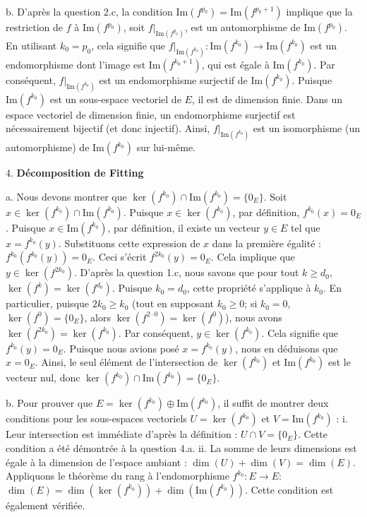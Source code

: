 \documentclass{report}
\begin{document}
    b.  D'après la question 2.c, la condition $\text{Im}(f^{p_0}) = \text{Im}(f^{p_0+1})$ implique que la restriction de $f$ à $\text{Im}(f^{p_0})$, soit $f|_{\text{Im}(f^{p_0})}$, est un automorphisme de $\text{Im}(f^{p_0})$.
        En utilisant $k_0 = p_0$, cela signifie que $f|_{\text{Im}(f^{k_0})} : \text{Im}(f^{k_0}) \to \text{Im}(f^{k_0})$ est un endomorphisme dont l'image est $\text{Im}(f^{k_0+1})$, qui est égale à $\text{Im}(f^{k_0})$.
        Par conséquent, $f|_{\text{Im}(f^{k_0})}$ est un endomorphisme surjectif de $\text{Im}(f^{k_0})$.
        Puisque $\text{Im}(f^{k_0})$ est un sous-espace vectoriel de $E$, il est de dimension finie.
        Dans un espace vectoriel de dimension finie, un endomorphisme surjectif est nécessairement bijectif (et donc injectif).
        Ainsi, $f|_{\text{Im}(f^{k_0})}$ est un isomorphisme (un automorphisme) de $\text{Im}(f^{k_0})$ sur lui-même.

4.  \textbf{Décomposition de Fitting}

    a.  Nous devons montrer que $\ker(f^{k_0}) \cap \text{Im}(f^{k_0}) = \{0_E\}$.
        Soit $x \in \ker(f^{k_0}) \cap \text{Im}(f^{k_0})$.
        Puisque $x \in \ker(f^{k_0})$, par définition, $f^{k_0}(x) = 0_E$.
        Puisque $x \in \text{Im}(f^{k_0})$, par définition, il existe un vecteur $y \in E$ tel que $x = f^{k_0}(y)$.
        Substituons cette expression de $x$ dans la première égalité :
        $f^{k_0}(f^{k_0}(y)) = 0_E$.
        Ceci s'écrit $f^{2k_0}(y) = 0_E$.
        Cela implique que $y \in \ker(f^{2k_0})$.
        D'après la question 1.c, nous savons que pour tout $k \ge d_0$, $\ker(f^k) = \ker(f^{d_0})$. Puisque $k_0 = d_0$, cette propriété s'applique à $k_0$.
        En particulier, puisque $2k_0 \ge k_0$ (tout en supposant $k_0 \ge 0$; si $k_0=0$, $\ker(f^0)=\{0_E\}$, alors $\ker(f^{2\cdot 0})=\ker(f^0)$), nous avons $\ker(f^{2k_0}) = \ker(f^{k_0})$.
        Par conséquent, $y \in \ker(f^{k_0})$.
        Cela signifie que $f^{k_0}(y) = 0_E$.
        Puisque nous avions posé $x = f^{k_0}(y)$, nous en déduisons que $x = 0_E$.
        Ainsi, le seul élément de l'intersection de $\ker(f^{k_0})$ et $\text{Im}(f^{k_0})$ est le vecteur nul, donc $\ker(f^{k_0}) \cap \text{Im}(f^{k_0}) = \{0_E\}$.

    b.  Pour prouver que $E = \ker(f^{k_0}) \oplus \text{Im}(f^{k_0})$, il suffit de montrer deux conditions pour les sous-espaces vectoriels $U = \ker(f^{k_0})$ et $V = \text{Im}(f^{k_0})$ :
        i.  Leur intersection est immédiate d'après la définition : $U \cap V = \{0_E\}$. Cette condition a été démontrée à la question 4.a.
        ii. La somme de leurs dimensions est égale à la dimension de l'espace ambiant : $\dim(U) + \dim(V) = \dim(E)$.
            Appliquons le théorème du rang à l'endomorphisme $f^{k_0} : E \to E$:
            $\dim(E) = \dim(\ker(f^{k_0})) + \dim(\text{Im}(f^{k_0}))$.
            Cette condition est également vérifiée.
\end{document}

